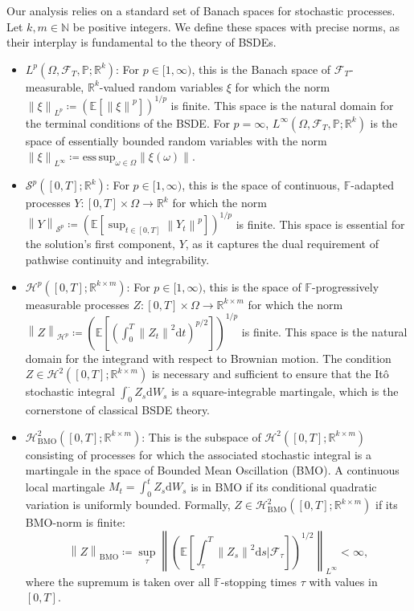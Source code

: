 \documentclass[qian]{imsart}
\newcommand{\R}{\mathbb{R}}
\newcommand{\Prob}{\mathbb{P}}
\newcommand{\E}{\mathbb{E}}
\newcommand{\Fcal}{\mathcal{F}}
\newcommand{\dd}{\mathrm{d}}
\newcommand{\norm}[1]{\left\lVert#1\right\rVert}
\theoremstyle{plain}
\theoremstyle{definition}
\begin{document}
Our analysis relies on a standard set of Banach spaces for stochastic processes. Let $k, m \in \mathbb{N}$ be positive integers. We define these spaces with precise norms, as their interplay is fundamental to the theory of BSDEs.

\begin{itemize}
    \item $L^p(\Omega, \Fcal_T, \Prob; \R^k)$: For $p \in [1, \infty)$, this is the Banach space of $\Fcal_T$-measurable, $\R^k$-valued random variables $\xi$ for which the norm $\norm{\xi}_{L^p} \coloneqq (\E[\norm{\xi}^p])^{1/p}$ is finite. This space is the natural domain for the terminal conditions of the BSDE. For $p=\infty$, $L^\infty(\Omega, \Fcal_T, \Prob; \R^k)$ is the space of essentially bounded random variables with the norm $\norm{\xi}_{L^\infty} \coloneqq \mathrm{ess\,sup}_{\omega \in \Omega} \norm{\xi(\omega)}$.

    \item $\mathcal{S}^p([0,T]; \R^k)$: For $p \in [1, \infty)$, this is the space of continuous, $\mathbb{F}$-adapted processes $Y: [0,T] \times \Omega \to \R^k$ for which the norm $\norm{Y}_{\mathcal{S}^p} \coloneqq \left(\E\left[\sup_{t \in [0,T]} \norm{Y_t}^p\right]\right)^{1/p}$ is finite. This space is essential for the solution's first component, $Y$, as it captures the dual requirement of pathwise continuity and integrability.

    \item $\mathcal{H}^p([0,T]; \R^{k \times m})$: For $p \in [1, \infty)$, this is the space of $\mathbb{F}$-progressively measurable processes $Z: [0,T] \times \Omega \to \R^{k \times m}$ for which the norm $\norm{Z}_{\mathcal{H}^p} \coloneqq \left(\E\left[\left(\int_0^T \norm{Z_t}^2 \dd t\right)^{p/2}\right]\right)^{1/p}$ is finite. This space is the natural domain for the integrand with respect to Brownian motion. The condition $Z \in \mathcal{H}^2([0,T]; \R^{k \times m})$ is necessary and sufficient to ensure that the Itô stochastic integral $\int_0^\cdot Z_s \dd W_s$ is a square-integrable martingale, which is the cornerstone of classical BSDE theory.

    \item $\mathcal{H}^2_{\mathrm{BMO}}([0,T]; \R^{k \times m})$: This is the subspace of $\mathcal{H}^2([0,T]; \R^{k \times m})$ consisting of processes for which the associated stochastic integral is a martingale in the space of Bounded Mean Oscillation (BMO). A continuous local martingale $M_t = \int_0^t Z_s \dd W_s$ is in BMO if its conditional quadratic variation is uniformly bounded. Formally, $Z \in \mathcal{H}^2_{\mathrm{BMO}}([0,T]; \R^{k \times m})$ if its BMO-norm is finite:
    \[ \norm{Z}_{\mathrm{BMO}} \coloneqq \sup_{\tau} \norm{ \left(\E\left[\int_\tau^T \norm{Z_s}^2 \dd s \bigg| \Fcal_\tau\right]\right)^{1/2} }_{L^\infty} < \infty, \]
    where the supremum is taken over all $\mathbb{F}$-stopping times $\tau$ with values in $[0,T]$.
\end{itemize}
\end{document}
